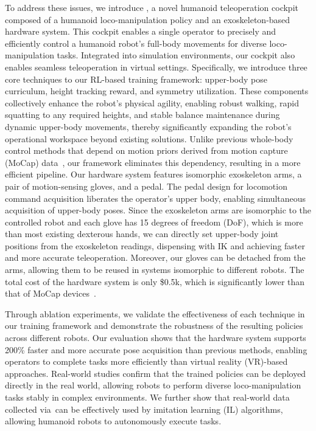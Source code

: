 To address these issues, we introduce \ourshort, a novel humanoid teleoperation cockpit composed of a humanoid loco-manipulation policy and an exoskeleton-based hardware system. This cockpit enables a single operator to precisely and efficiently control a humanoid robot's full-body movements for diverse loco-manipulation tasks. Integrated into simulation environments, our cockpit also enables seamless teleoperation in virtual settings. Specifically, we introduce three core techniques to our RL-based training framework: upper-body pose curriculum, height tracking reward, and symmetry utilization. These components collectively enhance the robot's physical agility, enabling robust walking, rapid squatting to any required heights, and stable balance maintenance during dynamic upper-body movements, thereby significantly expanding the robot's operational workspace beyond existing solutions. Unlike previous whole-body control methods that depend on motion priors derived from motion capture (MoCap) data~\cite{AMASS}, our framework eliminates this dependency, resulting in a more efficient pipeline. Our hardware system features isomorphic exoskeleton arms, a pair of motion-sensing gloves, and a pedal. The pedal design for locomotion command acquisition liberates the operator's upper body, enabling simultaneous acquisition of upper-body poses. Since the exoskeleton arms are isomorphic to the controlled robot and each glove has 15 degrees of freedom (DoF), which is more than most existing dexterous hands, we can directly set upper-body joint positions from the exoskeleton readings, dispensing with IK and achieving faster and more accurate teleoperation. Moreover, our gloves can be detached from the arms, allowing them to be reused in systems isomorphic to different robots. The total cost of the hardware system is only \$0.5k, which is significantly lower than that of MoCap devices~\cite{wang2024dexcap}.

Through ablation experiments, we validate the effectiveness of each technique in our training framework and demonstrate the robustness of the resulting policies across different robots. Our evaluation shows that the hardware system supports 200\% faster and more accurate pose acquisition than previous methods, enabling operators to complete tasks more efficiently than virtual reality (VR)-based approaches. Real-world studies confirm that the trained policies can be deployed directly in the real world, allowing robots to perform diverse loco-manipulation tasks stably in complex environments. We further show that real-world data collected via~\ourshort can be effectively used by imitation learning (IL) algorithms, allowing humanoid robots to autonomously execute tasks. 
 
